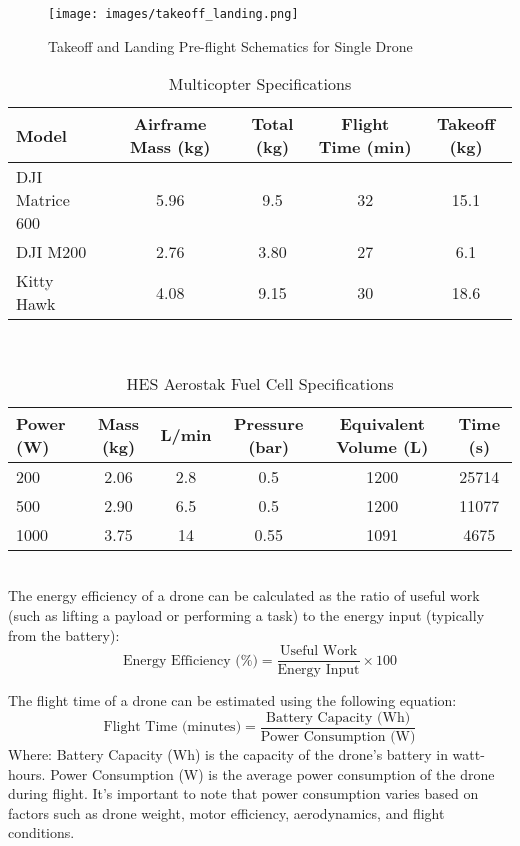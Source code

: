 \documentclass[preprint,12pt]{elsarticle}
\begin{document}
\begin{figure}[!htbp]
    \centering
    \texttt{[image: images/takeoff\_landing.png]}
    \caption{Takeoff and Landing Pre-flight Schematics for Single Drone}
\end{figure}



\begin{table}[htbp]
  \centering
  \caption{Multicopter Specifications}
  \begin{tabular}{lcccc}
    \toprule
    Model & Airframe Mass (kg) & Total (kg) & Flight Time (min) & Takeoff (kg) \\
    \midrule
    DJI Matrice 600 & 5.96 & 9.5 & 32 & 15.1 \\
    DJI M200 & 2.76 & 3.80 & 27 & 6.1 \\
    Kitty Hawk & 4.08 & 9.15 & 30 & 18.6 \\
    \bottomrule
  \end{tabular}
\end{table}\\

\begin{table}[htbp]
  \centering
  \caption{HES Aerostak Fuel Cell Specifications}
  \begin{tabular}{lccccc}
    \toprule
    Power (W) & Mass (kg) & L/min & Pressure (bar) & Equivalent Volume (L) & Time (s) \\
    \midrule
    200 & 2.06 & 2.8 & 0.5 & 1200 & 25714 \\
    500 & 2.90 & 6.5 & 0.5 & 1200 & 11077 \\
    1000 & 3.75 & 14 & 0.55 & 1091 & 4675 \\
    \bottomrule
  \end{tabular}
\end{table}\\


The energy efficiency of a drone can be calculated as the ratio of useful work (such as lifting a payload or performing a task) to the energy input (typically from the battery):
\begin{equation}
\text{Energy Efficiency (\%)} = \frac{\text{Useful Work}}{\text{Energy Input}} \times 100
\end{equation}

The flight time of a drone can be estimated using the following equation:
\begin{equation}
\text{Flight Time (minutes)} = \frac{\text{Battery Capacity (Wh)}}{\text{Power Consumption (W)}}
\end{equation}
Where:
Battery Capacity (Wh) is the capacity of the drone's battery in watt-hours.
Power Consumption (W) is the average power consumption of the drone during flight.
It's important to note that power consumption varies based on factors such as drone weight, motor efficiency, aerodynamics, and flight conditions.
\end{document}
